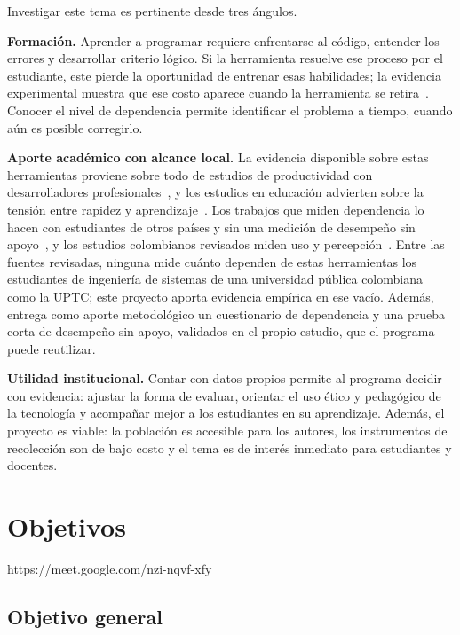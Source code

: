 \documentclass[12pt,letterpaper]{article}
\numberwithin{table}{section}
\numberwithin{figure}{section}
\begin{document}
Investigar este tema es pertinente desde tres ángulos.

\textbf{Formación.} Aprender a programar requiere enfrentarse al código, entender los errores y desarrollar criterio lógico. Si la herramienta resuelve ese proceso por el estudiante, este pierde la oportunidad de entrenar esas habilidades; la evidencia experimental muestra que ese costo aparece cuando la herramienta se retira~\cite{bastani2025generative}. Conocer el nivel de dependencia permite identificar el problema a tiempo, cuando aún es posible corregirlo.

\textbf{Aporte académico con alcance local.} La evidencia disponible sobre estas herramientas proviene sobre todo de estudios de productividad con desarrolladores profesionales~\cite{peng2023impact,ziegler2024measuring}, y los estudios en educación advierten sobre la tensión entre rapidez y aprendizaje~\cite{becker2023programming,prather2024widening}. Los trabajos que miden dependencia lo hacen con estudiantes de otros países y sin una medición de desempeño sin apoyo~\cite{moralesgarcia2024development,zhang2024dependency}, y los estudios colombianos revisados miden uso y percepción~\cite{gomez2025estudio}. Entre las fuentes revisadas, ninguna mide cuánto dependen de estas herramientas los estudiantes de ingeniería de sistemas de una universidad pública colombiana como la UPTC; este proyecto aporta evidencia empírica en ese vacío. Además, entrega como aporte metodológico un cuestionario de dependencia y una prueba corta de desempeño sin apoyo, validados en el propio estudio, que el programa puede reutilizar.

\textbf{Utilidad institucional.} Contar con datos propios permite al programa decidir con evidencia: ajustar la forma de evaluar, orientar el uso ético y pedagógico de la tecnología y acompañar mejor a los estudiantes en su aprendizaje. Además, el proyecto es viable: la población es accesible para los autores, los instrumentos de recolección son de bajo costo y el tema es de interés inmediato para estudiantes y docentes.

\section{Objetivos}https://meet.google.com/nzi-nqvf-xfy

\subsection{Objetivo general}
\end{document}
